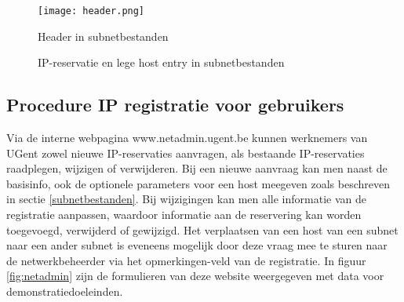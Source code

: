 \begin{figure}[H]
    \texttt{[image: header.png]}
    \caption{Header in subnetbestanden}
    \label{fig:header}
\end{figure}

\begin{figure}[H]
    \hspace*{\fill}
    \caption{IP-reservatie en lege host entry in subnetbestanden}
    \label{fig:host}
\end{figure}




\subsection{Procedure IP registratie voor gebruikers}
Via de interne webpagina www.netadmin.ugent.be kunnen werknemers van UGent zowel nieuwe IP-reservaties aanvragen, als bestaande IP-reservaties raadplegen, wijzigen of verwijderen. Bij een nieuwe aanvraag kan men naast de basisinfo, ook de optionele parameters voor een host meegeven zoals beschreven in sectie \ref{subnetbestanden}. Bij wijzigingen kan men alle informatie van de registratie aanpassen, waardoor informatie aan de reservering kan worden toegevoegd, verwijderd of gewijzigd. Het verplaatsen van een host van een subnet naar een ander subnet is eveneens mogelijk door deze vraag mee te sturen naar de netwerkbeheerder via het opmerkingen-veld van de registratie. In figuur \ref{fig:netadmin} zijn de formulieren van deze website weergegeven met data voor demonstratiedoeleinden.

